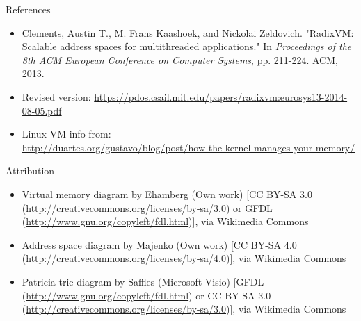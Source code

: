 \documentclass[aspectratio=169]{beamer}
\newcommand{\bi}{\begin{itemize}}
\newcommand{\ei}{\end{itemize}}
\begin{document}

\begin{frame}[noframenumbering]{References}
  \bi
\item Clements, Austin T., M. Frans Kaashoek, and Nickolai Zeldovich. "RadixVM: Scalable address spaces for multithreaded applications." In \emph{Proceedings of the 8th ACM European Conference on Computer Systems}, pp. 211-224. ACM, 2013.
  \item Revised version: \url{https://pdos.csail.mit.edu/papers/radixvm:eurosys13-2014-08-05.pdf}
\item Linux VM info from:\\ \url{http://duartes.org/gustavo/blog/post/how-the-kernel-manages-your-memory/}
  \ei
\end{frame}

\begin{frame}[noframenumbering]{Attribution}
  \bi
\item Virtual memory diagram by Ehamberg (Own work) [CC BY-SA 3.0 (\url{http://creativecommons.org/licenses/by-sa/3.0}) or GFDL (\url{http://www.gnu.org/copyleft/fdl.html})], via Wikimedia Commons
\item Address space diagram by Majenko (Own work) [CC BY-SA 4.0 (\url{http://creativecommons.org/licenses/by-sa/4.0})], via Wikimedia Commons
\item Patricia trie diagram by Saffles (Microsoft Visio) [GFDL (\url{http://www.gnu.org/copyleft/fdl.html}) or CC BY-SA 3.0 (\url{http://creativecommons.org/licenses/by-sa/3.0})], via Wikimedia Commons
  \ei
\end{frame}
\end{document}
